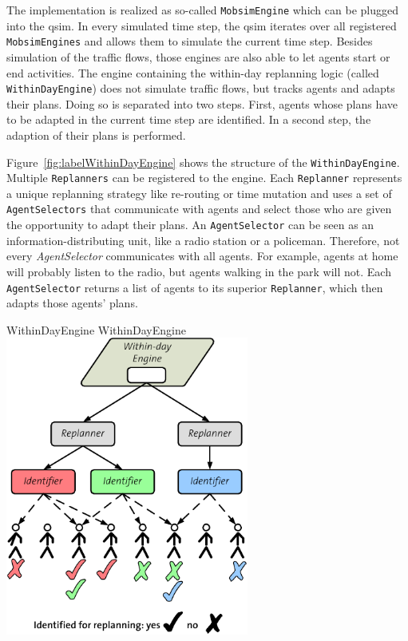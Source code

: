 The implementation is realized as so-called \lstinline{MobsimEngine} which can be plugged into the \gls{qsim}. In every simulated time step, the \gls{qsim} iterates over all registered \lstinline{MobsimEngines} and allows them to simulate the current time step. Besides simulation of the traffic flows, those engines are also able to let agents start or end activities. The engine containing the within-day replanning logic (called \lstinline{WithinDayEngine}) does not simulate traffic flows, but tracks agents and adapts their plans. Doing so is separated into two steps. First, agents whose plans have to be adapted in the current time step are identified. In a second step, the adaption of their plans is performed. 
%

Figure~\ref{fig:labelWithinDayEngine} shows the structure of the \lstinline{WithinDayEngine}. Multiple \lstinline{Replanners} can be registered to the engine. Each \lstinline{Replanner} represents a unique replanning strategy like re-routing or time mutation and uses a set of \lstinline{AgentSelectors} that communicate with agents and select those who are given the opportunity to adapt their plans. An \lstinline{AgentSelector} can be seen as an information-distributing unit, like a radio station or a policeman. Therefore, not every \emph{AgentSelector} communicates with all agents. For example, agents at home will probably listen to the radio, but agents walking in the park will not. Each \lstinline{AgentSelector} returns a list of agents to its superior \lstinline{Replanner}, which then adapts those agents' plans.

\createfigure%
{WithinDayEngine}%
{WithinDayEngine}%
{\label{fig:labelWithinDayEngine}}%
{\includegraphics[width=8.0cm, angle=0]{extending/figures/WithinDayReplanning/ReplanningManager}}%
{}
%

